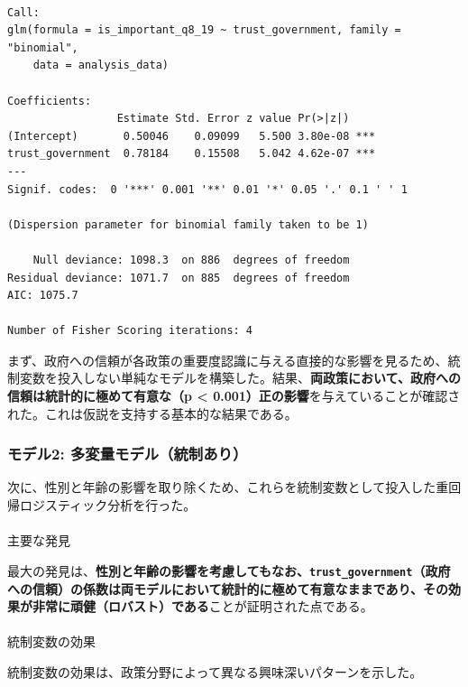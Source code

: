 \documentclass[
  xelatex]{bxjsarticle}
\makeatletter
\let\oldparagraph\paragraph
\renewcommand{\paragraph}{
    \@ifstar
      \xxxParagraphStar
      \xxxParagraphNoStar
  }
\newcommand{\xxxParagraphStar}[1]{\oldparagraph*{#1}\mbox{}}
\newcommand{\xxxParagraphNoStar}[1]{\oldparagraph{#1}\mbox{}}
\makeatother
\begin{document}
\begin{verbatim}

Call:
glm(formula = is_important_q8_19 ~ trust_government, family = "binomial", 
    data = analysis_data)

Coefficients:
                 Estimate Std. Error z value Pr(>|z|)    
(Intercept)       0.50046    0.09099   5.500 3.80e-08 ***
trust_government  0.78184    0.15508   5.042 4.62e-07 ***
---
Signif. codes:  0 '***' 0.001 '**' 0.01 '*' 0.05 '.' 0.1 ' ' 1

(Dispersion parameter for binomial family taken to be 1)

    Null deviance: 1098.3  on 886  degrees of freedom
Residual deviance: 1071.7  on 885  degrees of freedom
AIC: 1075.7

Number of Fisher Scoring iterations: 4
\end{verbatim}

まず、政府への信頼が各政策の重要度認識に与える直接的な影響を見るため、統制変数を投入しない単純なモデルを構築した。結果、\textbf{両政策において、政府への信頼は統計的に極めて有意な（p
\textless{}
0.001）正の影響}を与えていることが確認された。これは仮説を支持する基本的な結果である。

\subsubsection{モデル2:
多変量モデル（統制あり）}\label{ux30e2ux30c7ux30eb2-ux591aux5909ux91cfux30e2ux30c7ux30ebux7d71ux5236ux3042ux308a}

次に、性別と年齢の影響を取り除くため、これらを統制変数として投入した重回帰ロジスティック分析を行った。

\paragraph{主要な発見}\label{ux4e3bux8981ux306aux767aux898b}

最大の発見は、\textbf{性別と年齢の影響を考慮してもなお、\texttt{trust\_government}（政府への信頼）の係数は両モデルにおいて統計的に極めて有意なままであり、その効果が非常に頑健（ロバスト）である}ことが証明された点である。

\paragraph{統制変数の効果}\label{ux7d71ux5236ux5909ux6570ux306eux52b9ux679c}

統制変数の効果は、政策分野によって異なる興味深いパターンを示した。
\end{document}
